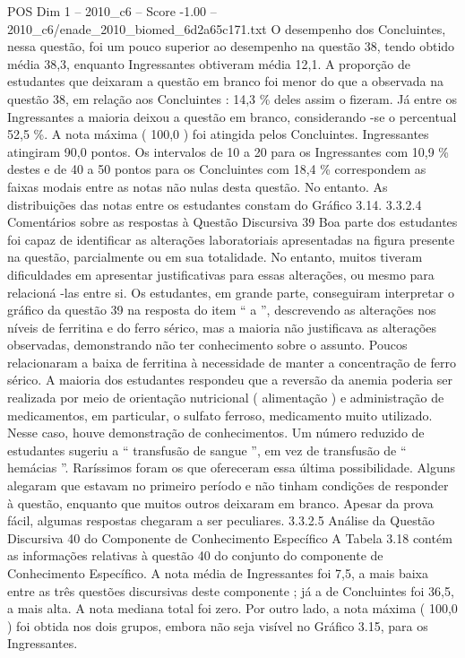 \begin{textsample}{POS Dim 1 – 2010\_c6 – Score -1.00 – 2010\_c6/enade\_2010\_biomed\_6d2a65c171.txt}
O desempenho dos Concluintes, nessa questão, foi um pouco superior ao desempenho na questão 38, tendo obtido média 38,3, enquanto Ingressantes obtiveram média 12,1.
A proporção de estudantes que deixaram a questão em branco foi menor do que a observada na questão 38, em relação aos Concluintes : 14,3 \% deles assim o fizeram.
Já entre os Ingressantes a maioria deixou a questão em branco, considerando -se o percentual 52,5 \%.
A nota máxima ( 100,0 ) foi atingida pelos Concluintes.
Ingressantes atingiram 90,0 pontos.
Os intervalos de 10 a 20 para os Ingressantes com 10,9 \% destes e de 40 a 50 pontos para os Concluintes com 18,4 \% correspondem as faixas modais entre as notas não nulas desta questão.
No entanto.
As distribuições das notas entre os estudantes constam do Gráfico 3.14. 3.3.2.4 Comentários sobre as respostas à Questão Discursiva 39 Boa parte dos estudantes foi capaz de identificar as alterações laboratoriais apresentadas na figura presente na questão, parcialmente ou em sua totalidade.
No entanto, muitos tiveram dificuldades em apresentar justificativas para essas alterações, ou mesmo para relacioná -las entre si.
Os estudantes, em grande parte, conseguiram interpretar o gráfico da questão 39 na resposta do item “ a ”, descrevendo as alterações nos níveis de ferritina e do ferro sérico, mas a maioria não justificava as alterações observadas, demonstrando não ter conhecimento sobre o assunto.
Poucos relacionaram a baixa de ferritina à necessidade de manter a concentração de ferro sérico.
A maioria dos estudantes respondeu que a reversão da anemia poderia ser realizada por meio de orientação nutricional ( alimentação ) e administração de medicamentos, em particular, o sulfato ferroso, medicamento muito utilizado.
Nesse caso, houve demonstração de conhecimentos.
Um número reduzido de estudantes sugeriu a “ transfusão de sangue ”, em vez de transfusão de “ hemácias ”.
Raríssimos foram os que ofereceram essa última possibilidade.
Alguns alegaram que estavam no primeiro período e não tinham condições de responder à questão, enquanto que muitos outros deixaram em branco.
Apesar da prova fácil, algumas respostas chegaram a ser peculiares. 3.3.2.5 Análise da Questão Discursiva 40 do Componente de Conhecimento Específico A Tabela 3.18 contém as informações relativas à questão 40 do conjunto do componente de Conhecimento Específico.
A nota média de Ingressantes foi 7,5, a mais baixa entre as três questões discursivas deste componente ; já a de Concluintes foi 36,5, a mais alta.
A nota mediana total foi zero.
Por outro lado, a nota máxima ( 100,0 ) foi obtida nos dois grupos, embora não seja visível no Gráfico 3.15, para os Ingressantes.

\end{textsample}
